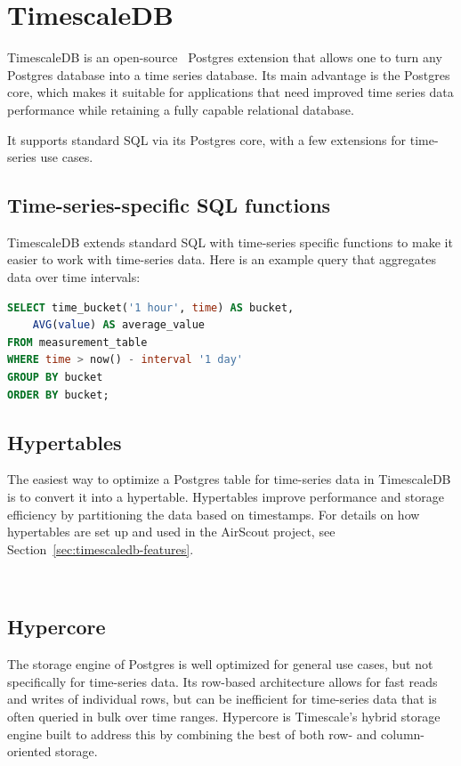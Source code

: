 \section{TimescaleDB}

TimescaleDB is an open-source~\cite{TimescaleDB:07} Postgres extension that
allows one to turn any Postgres database into a time series database. Its main
advantage is the Postgres core, which makes it suitable for applications that
need improved time series data performance while retaining a fully capable
relational database.

It supports standard SQL via its Postgres core, with a few extensions for
time-series use cases.~\cite{TimescaleDB:08}

\subsection{Time-series-specific SQL functions}

TimescaleDB extends standard SQL with time-series specific functions to make it
easier to work with time-series data. Here is an example query that aggregates
data over time intervals:

\begin{lstlisting}[language=SQL, caption={TimescaleDB query to aggregate data over time intervals.}, label={lst:timescaledb-query}]
SELECT time_bucket('1 hour', time) AS bucket,
    AVG(value) AS average_value
FROM measurement_table
WHERE time > now() - interval '1 day'
GROUP BY bucket
ORDER BY bucket;
\end{lstlisting}

\subsection{Hypertables}

The easiest way to optimize a Postgres table for time-series data in
TimescaleDB is to convert it into a hypertable. Hypertables improve performance
and storage efficiency by partitioning the data based on timestamps. For
details on how hypertables are set up and used in the AirScout project, see
Section~\ref{sec:timescaledb-features}.

~\cite{TimescaleDB:02}

\subsection{Hypercore}

The storage engine of Postgres is well optimized for general use cases, but not
specifically for time-series data. Its row-based architecture allows for fast
reads and writes of individual rows, but can be inefficient for time-series
data that is often queried in bulk over time ranges. Hypercore is Timescale's
hybrid storage engine built to address this by combining the best of both row-
and column-oriented storage.


